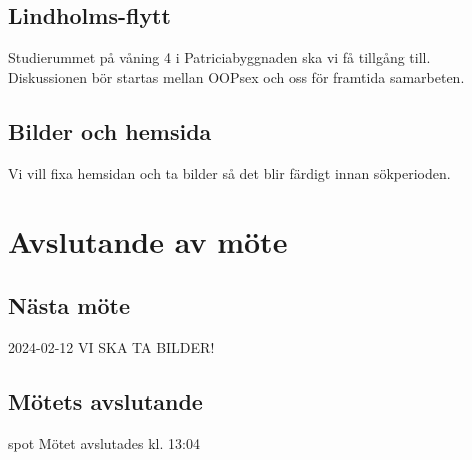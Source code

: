 \documentclass[protokoll]{dvd}
\begin{document}
\subsection*{Lindholms-flytt}
Studierummet på våning 4 i Patriciabyggnaden ska vi få tillgång till.
Diskussionen bör startas mellan OOPsex och oss för framtida samarbeten.

\subsection*{Bilder och hemsida}
Vi vill fixa hemsidan och ta bilder så det blir färdigt innan sökperioden.

\newpage
\section{Avslutande av möte}

\subsection{Nästa möte} 
2024-02-12 VI SKA TA BILDER!

\subsection{Mötets avslutande}spot
Mötet avslutades kl. 13:04

\styrelsesignaturer
\end{document}
